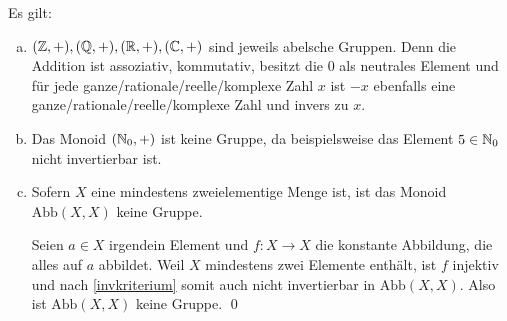 \begin{bsp}
 Es gilt:
 \begin{enumerate}[a)]
  \item $({\mathbb Z},+),({\mathbb Q},+),({\mathbb R},+),({\mathbb C},+)$ sind jeweils abelsche Gruppen. Denn die Addition ist assoziativ, kommutativ, besitzt die $0$ als neutrales Element und für jede ganze/rationale/reelle/komplexe Zahl $x$ ist $-x$ ebenfalls eine ganze/rationale/reelle/komplexe Zahl und invers zu $x$.
  \item Das Monoid $({\mathbb N}_0,+)$ ist keine Gruppe, da beispielsweise das Element $5\in {\mathbb N}_0$ nicht invertierbar ist.
  \item Sofern $X$ eine mindestens zweielementige Menge ist, ist das Monoid $\text{Abb}(X,X)$ keine Gruppe.
\begin{bew}[(*)]
 Seien $a\in X$ irgendein Element und $f:X\to X$ die konstante Abbildung, die alles auf $a$ abbildet. Weil $X$ mindestens zwei Elemente enthält, ist $f$ injektiv und nach \cref{invkriterium} somit auch nicht invertierbar in $\text{Abb}(X,X)$. Also ist $\text{Abb}(X,X)$ keine Gruppe. \qed
\end{bew}
 \end{enumerate}
\end{bsp}



